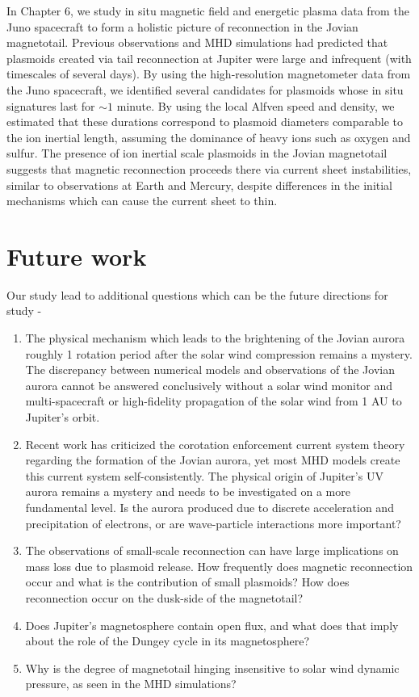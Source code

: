 In Chapter 6, we study in situ magnetic field and energetic plasma data from the Juno spacecraft to form a holistic picture of reconnection in the Jovian magnetotail. Previous observations and MHD simulations had predicted that plasmoids created via tail reconnection at Jupiter were large and infrequent (with timescales of several days). By using the high-resolution magnetometer data from the Juno spacecraft, we identified several candidates for plasmoids whose in situ signatures last for $\sim1$ minute. By using the local Alfven speed and density, we estimated that these durations correspond to plasmoid diameters comparable to the ion inertial length, assuming the dominance of heavy ions such as oxygen and sulfur. The presence of ion inertial scale plasmoids in the Jovian magnetotail suggests that magnetic reconnection proceeds there via current sheet instabilities, similar to observations at Earth and Mercury, despite differences in the initial mechanisms which can cause the current sheet to thin. 

\section{Future work}

Our study lead to additional questions which can be the future directions for study - 

\begin{enumerate}
    \item The physical mechanism which leads to the brightening of the Jovian aurora roughly 1 rotation period after the solar wind compression remains a mystery. The discrepancy between numerical models and observations of the Jovian aurora cannot be answered conclusively without a solar wind monitor and multi-spacecraft or high-fidelity propagation of the solar wind from 1 AU to Jupiter's orbit.
    
    \item Recent work has criticized the corotation enforcement current system theory \cite{Bonfond2020SixJupiter} regarding the formation of the Jovian aurora, yet most MHD models create this current system self-consistently. The physical origin of Jupiter's UV aurora remains a mystery and needs to be investigated on a more fundamental level. Is the aurora produced due to discrete acceleration and precipitation of electrons, or are wave-particle interactions more important?
    
    \item The observations of small-scale reconnection can have large implications on mass loss due to plasmoid release. How frequently does magnetic reconnection occur and what is the contribution of small plasmoids? How does reconnection occur on the dusk-side of the magnetotail?
    
    \item Does Jupiter's magnetosphere contain open flux, and what does that imply about the role of the Dungey cycle in its magnetosphere?
    
    \item Why is the degree of magnetotail hinging insensitive to solar wind dynamic pressure, as seen in the MHD simulations? 
\end{enumerate}